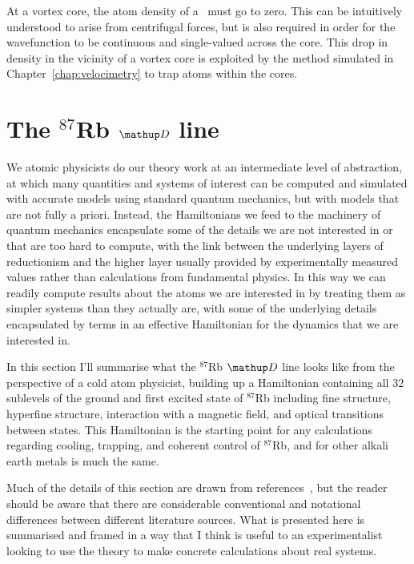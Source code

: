 At a vortex core, the atom density of a \bec\ must go to zero. This can be intuitively understood to arise from centrifugal forces, but is also required in order for the wavefunction to be continuous and single-valued across the core. This drop in density in the vicinity of a vortex core is exploited by the method simulated in Chapter~\ref{chap:velocimetry} to trap atoms within the cores.

\section{The $^{87}$Rb $\up{D}$ line}\label{sec:the_rubidium_D_line}

We atomic physicists do our theory work at an intermediate level of abstraction, at which many quantities and systems of interest can be computed and simulated with accurate models using standard quantum mechanics, but with models that are not fully a priori. Instead, the Hamiltonians we feed to the machinery of quantum mechanics encapsulate some of the details we are not interested in or that are too hard to compute, with the link between the underlying layers of reductionism and the higher layer usually provided by experimentally measured values rather than calculations from fundamental physics. In this way we can readily compute results about the atoms we are interested in by treating them as simpler systems than they actually are, with some of the underlying details encapsulated by terms in an effective Hamiltonian for the dynamics that we are interested in.

In this section I'll summarise what the $^{87}$Rb $\up{D}$ line looks like from the perspective of a cold atom physicist, building up a Hamiltonian containing all 32 sublevels of the ground and first excited state of $^{87}$Rb including fine structure, hyperfine structure, interaction with a magnetic field, and optical transitions between states. This Hamiltonian is the starting point for any calculations regarding cooling, trapping, and coherent control of $^{87}$Rb, and for other alkali earth metals is much the same.

Much of the details of this section are drawn from references~\cite{steck_rubidium_2015, steck_quantum_2017, metcalf_laser_1999, king_angular_2008, farrell_consistency_1995}, but the reader should be aware that there are considerable conventional and notational differences between different literature sources. What is presented here is summarised and framed in a way that I think is useful to an experimentalist looking to use the theory to make concrete calculations about real systems.

